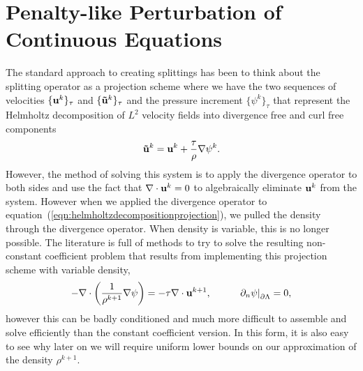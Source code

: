 \documentclass[letterpaper]{erdc}
\begin{document}
%
%
%
\section{Penalty-like Perturbation of Continuous Equations}

The standard approach to creating splittings has been to think about the
splitting operator as a projection scheme where we have the two sequences of
velocities $\{\textbf{u}^{k}\}_{\tau}$ and $\{\mathbf{\tilde{u}}^{k}\}_{\tau}$ and the pressure
increment $\{\psi^{k}\}_{\tau}$ that represent the Helmholtz decomposition of
$L^{2}$ velocity fields into divergence free and curl free components
\begin{equation}\label{eqn:helmholtzdecompositionprojection}
  \mathbf{\tilde{u}}^{k} = \textbf{u}^{k} + \frac{\tau}{\rho}\nabla \psi^{k}.
\end{equation}
However, the method of solving this system is to apply the divergence operator
to both sides and use the fact that $\nabla\cdot \textbf{u}^k = 0$ to algebraically
eliminate $\textbf{u}^k$ from the system.  However when we applied the divergence
operator to equation~(\ref{eqn:helmholtzdecompositionprojection}), we pulled
the density through the divergence operator.  When density is variable, this is
no longer possible.  The literature is full of methods to try to solve the
resulting non-constant coefficient problem that results from implementing this
projection scheme with variable density,
\begin{equation}
  -\nabla\cdot\left(\frac{1}{\rho^{k+1}} \nabla\psi \right) = -\tau\nabla\cdot \textbf{u}^{k+1},  \hspace{1cm} \left.\partial_n \psi\right|_{\partial\Lambda} = 0,
\end{equation}  
however this can be badly conditioned and much more difficult to assemble and
solve efficiently than the constant coefficient version.  In this form, it is
also easy to see why later on we will require uniform lower bounds on our
approximation of the density $\rho^{k+1}$.
\end{document}
